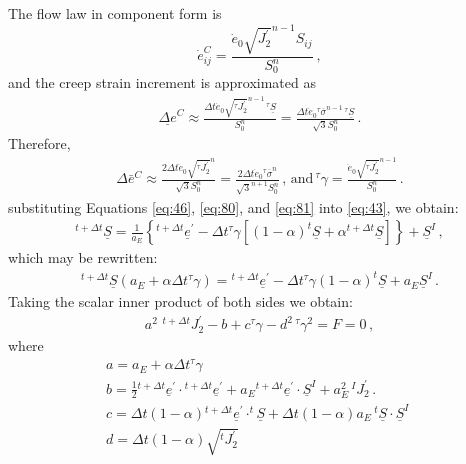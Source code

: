 The flow law in component form is 
\begin{equation}
\dot{e}_{ij}^{C}=\frac{\dot{e}_{0}\sqrt{J_{2}^{\prime}}^{n-1}S_{ij}}{S_{0}^{n}}\:,\label{eq:79}
\end{equation}
and the creep strain increment is approximated as
\begin{gather}
\underline{\Delta e}^{C}\approx\frac{\Delta t\dot{e}_{0}\sqrt{^{\tau}J_{2}^{\prime}}^{n-1}\,^{\tau}\underline{S}}{S_{0}^{n}}=\frac{\Delta t\dot{e}_{0}\phantom{}^{\tau}\overline{\sigma}^{n-1}\,^{\tau}\underline{S}}{\sqrt{3}S_{0}^{n}}\,.\label{eq:80}
\end{gather}
 Therefore,
\begin{gather}
\Delta\bar{e}^{C}\approx\frac{2\Delta t\dot{e}_{0}\sqrt{^{\tau}J_{2}^{\prime}}^{n}}{\sqrt{3}S_{0}^{n}}=\frac{2\Delta t\dot{e}_{0}\phantom{}^{\tau}\overline{\sigma}^{n}}{\sqrt{3}^{n+1}S_{0}^{n}}\,,\,\textrm{and}\,^{\tau}\gamma=\frac{\dot{e}_{0}\sqrt{^{\tau}J_{2}^{\prime}}^{n-1}}{S_{0}^{n}}\,.\label{eq:81}
\end{gather}
substituting Equations \vref{eq:46}, \vref{eq:80}, and \vref{eq:81}
into \vref{eq:43}, we obtain:
\begin{gather}
^{t+\Delta t}\underline{S}=\frac{1}{a_{E}}\left\{ ^{t+\Delta t}\underline{e}^{\prime}-\Delta t\phantom{}^{\tau}\gamma\left[\left(1-\alpha\right)^{t}\underline{S}+\alpha{}^{t+\Delta t}\underline{S}\right]\right\} +\underline{S}^{I}\,,\label{eq:82}
\end{gather}
which may be rewritten:
\begin{gather}
^{t+\Delta t}\underline{S}\left(a_{E}+\alpha\Delta t\phantom{}^{\tau}\gamma\right)={}^{t+\Delta t}\underline{e}^{\prime}-\Delta t\phantom{}^{\tau}\gamma\left(1-\alpha\right)^{t}\underline{S}+a_{E}\underline{S}^{I}\,.\label{eq:83}
\end{gather}
Taking the scalar inner product of both sides we obtain:
\begin{gather}
a^{2}\,\,{}^{t+\Delta t}J_{2}^{\prime}-b+c\phantom{}^{\tau}\gamma-d^{2}\,^{\tau}\gamma^{2}=F=0\,,\label{eq:84}
\end{gather}
where
\begin{gather}
a=a_{E}+\alpha\Delta t\phantom{}^{\tau}\gamma\,\,\nonumber \\
b=\frac{1}{2}{}^{t+\Delta t}\underline{e}^{\prime}\cdot{}^{t+\Delta t}\underline{e}^{\prime}+a_{E}{}^{t+\Delta t}\underline{e}^{\prime}\cdot\underline{S}^{I}+a_{E}^{2}\,^{I}J_{2}^{\prime}\,.\label{eq:85}\\
c=\Delta t\left(1-\alpha\right){}^{t+\Delta t}\underline{e}^{\prime}\cdot^{t}\underline{S}+\Delta t\left(1-\alpha\right)a_{E}\,^{t}\underline{S}\cdot\underline{S}^{I}\,\,\nonumber \\
d=\Delta t\left(1-\alpha\right)\sqrt{^{t}J_{2}^{\prime}}\,\,\nonumber 
\end{gather}
